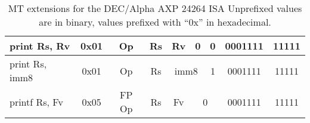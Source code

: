 \documentclass[a4paper,11pt]{article}
\begin{document}
\begin{table}
\begin{center}
{\begin{tabular}{|>{\ttfamily}l||c|c|c|c|c|c|c|c|}
\hline \hline
print Rs, Rv            & 0x01 & Op     & Rs &                    Rv & 0 & 0 & 0001111 & 11111 \\ \cline{5-6}
print Rs, imm8          & 0x01 & Op     & Rs & \multicolumn{2}{c|}{imm8} & 1 & 0001111 & 11111 \\ \cline{5-7}
printf Rs, Fv           & 0x05 & FP Op  & Rs & Fv & \multicolumn{2}{c|}{0} &  0001111  & 11111 \\ 
\hline
\end{tabular}
\caption{MT extensions for the DEC/Alpha AXP 24264 ISA \newline Unprefixed values are in binary, values prefixed with ``0x'' in hexadecimal.}
}\end{center}
\end{table}
\end{document}
